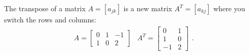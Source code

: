 \documentclass[10pt]{article}
\begin{document}
The transpose of a matrix {$A=[a_{jk}]$} is a new matrix {$A^T=[a_{kj}]$} where you switch the rows and columns:  
$$\begin{array}{ccc}
A =\begin{bmatrix} 0&1&-1\\1&0&2
\end{bmatrix} &
A^T = \begin{bmatrix} 0&1\\1&0
\\-1&2\end{bmatrix} 
\end{array}.$$
%
%
%
\end{document}

